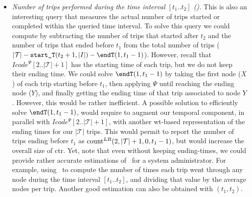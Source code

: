 \begin{itemize}
	\item {\em Number of trips performed during the time interval $[t_1..t_2]$ (\tripT).} This is also an interesting query that measures the actual number of trips started or completed within the queried time interval. 
	To solve this query
	we could compute {\em \tripT} by subtracting the number of trips that started after $t_2$  and the number of trips that ended 	before $t_1$ from the total number of trips ($|\mathcal{T}| - \startT(t_2+1,|I|) - \endT(1,t_1-1)$). 
	However, recall that
	$Icode^{\Psi}[2..|\mathcal{T}|+1]$ has the starting time of each trip, but we do not keep their ending time.
	We could solve $\endT(1,t_1-1)$ by taking the first node ($X$) of each trip starting
	before $t_1$, then applying $\Psi$ until reaching the ending node ($Y$), and finally getting the ending
	time of that trip associated to node $Y$. However, this would be rather inefficient.
	A possible solution to efficiently solve $\endT(1,t_1-1)$, would require to augment our temporal
	component, in parallel with $Icode^{\Psi}[2..|\mathcal{T}|+1]$, with another \gls{wt}-based representation of the 
	ending times for our $|\mathcal{T}|$ trips. This would permit to report the number of trips
	ending before $t_1$ as $\operatorname{count}^{LR}(2,|\mathcal{T}|+1,0,t_1-1)$, but would increase the overall size of \gls{ctr}.
	Yet, note that even without keeping ending-times, we could 
	provide rather accurate estimations of \tripT\ for a system administrator. For example, using \loadT\
	to compute the number of times each trip went through any node during the time interval $[t_1..t_2]$, 
	and dividing that value by the average nodes per trip. Another good estimation can also be obtained with \startT$(t_1,t_2)$.


	\end{itemize}

